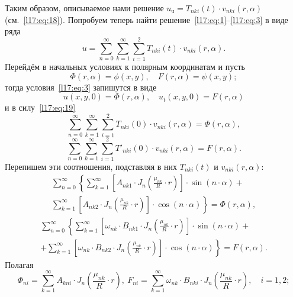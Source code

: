  Таким образом, описываемое нами решение $u_{\text{ч}}=T_{nki}(t)\cdot v_{nki}(r,\alpha)$ (см.~\eqref{l17:eq:18}). Попробуем теперь найти решение~\eqref{l17:eq:1}--\eqref{l17:eq:3} в виде ряда 
\begin{equation}\label{l17:eq:19}
	 u=\sum\limits_{n=0}^{\infty}\sum\limits_{k=1}^{\infty}\sum\limits_{i=1}^{2}T_{nki}(t)\cdot v_{nki}(r,\alpha).
\end{equation}
Перейдём в начальных условиях к полярным координатам и пусть
\begin{equation*}
	\Phi(r,\alpha)=\phi(x,y),\quad F(r,\alpha)=\psi(x,y);
\end{equation*}
тогда условия~\eqref{l17:eq:3} запишутся в виде
\begin{equation*}
	 u(x,y,0)=\Phi(r,\alpha),\quad u_t(x,y,0)=F(r,\alpha)
\end{equation*}
и в силу~\eqref{l17:eq:19}
\begin{equation}\label{l17:eq:20}
	\sum\limits_{n=0}^{\infty}\sum\limits_{k=1}^{\infty}\sum\limits_{i=1}^{2}T_{nki}(0)\cdot v_{nki}(r,\alpha)=\Phi(r,\alpha),
\end{equation}
\begin{equation}\label{l17:eq:21}
	\sum\limits_{n=0}^{\infty}\sum\limits_{k=1}^{\infty}\sum\limits_{i=1}^{2}T'_{nki}(0)\cdot v_{nki}(r,\alpha)=F(r,\alpha).
\end{equation}
Перепишем эти соотношения,  подставляя в них   $T_{nki}(t)$ и $v_{nki}(r,\alpha)$:
\begin{multline}\label{l17:eq:22}
	\sum\limits_{n=0}^{\infty}\left\{\sum\limits_{k=1}^{\infty}\left[A_{nk1}\cdot J_n\left(\frac{\mu_{nk}}{R}\cdot r\right)\right]\cdot\sin\left(n\cdot\alpha\right)+\right.\\\left.\sum\limits_{k=1}^{\infty}\left[A_{nk2}\cdot J_n\left(\frac{\mu_{nk}}{R}\cdot r\right)\right]\cdot\cos\left(n\cdot\alpha\right) \right\}=\Phi(r,\alpha),
\end{multline}
\begin{multline}\label{l17:eq:23}
	\sum\limits_{n=0}^{\infty}\left\{\sum\limits_{k=1}^{\infty}\left[\omega_{nk}\cdot B_{nk1}\cdot J_n\left(\frac{\mu_{nk}}{R}\cdot r\right)\right]\cdot\sin\left(n\cdot\alpha\right)+\right.\\\left.+\sum\limits_{k=1}^{\infty}\left[\omega_{nk}\cdot B_{nk2}\cdot J_n\left(\frac{\mu_{nk}}{R}\cdot r\right)\right]\cdot\cos\left(n\cdot\alpha\right) \right\}=F(r,\alpha).
\end{multline}
Полагая 
\begin{equation}\label{l17:eq:24}
	\Phi_{ni}=\sum\limits_{k=1}^{\infty}A_{kni}\cdot J_{n}\left(\frac{\mu_{nk}}{R}\cdot r\right),\  F_{ni}=\sum\limits_{k=1}^{\infty}\omega_{nk}\cdot B_{nki}\cdot J_{n}\left(\frac{\mu_{nk}}{R}\cdot r\right),\quad i=1,2;
\end{equation}
